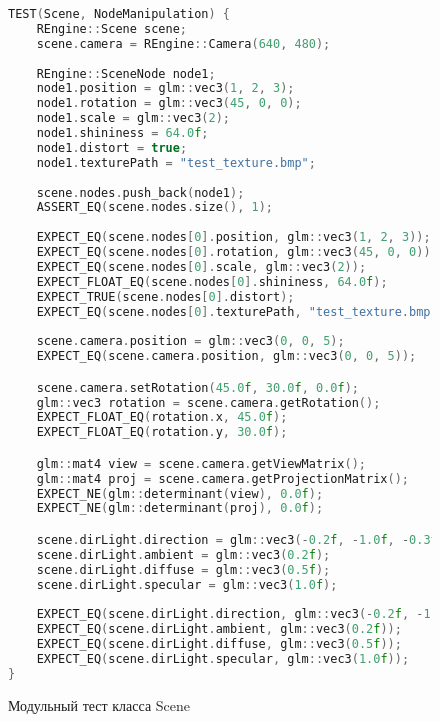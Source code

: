 \begin{figure}[ht]
\begin{lstlisting}[language=C++]
TEST(Scene, NodeManipulation) {
    REngine::Scene scene;
    scene.camera = REngine::Camera(640, 480);
    
    REngine::SceneNode node1;
    node1.position = glm::vec3(1, 2, 3);
    node1.rotation = glm::vec3(45, 0, 0);
    node1.scale = glm::vec3(2);
    node1.shininess = 64.0f;
    node1.distort = true;
    node1.texturePath = "test_texture.bmp";
    
    scene.nodes.push_back(node1);
    ASSERT_EQ(scene.nodes.size(), 1);
    
    EXPECT_EQ(scene.nodes[0].position, glm::vec3(1, 2, 3));
    EXPECT_EQ(scene.nodes[0].rotation, glm::vec3(45, 0, 0));
    EXPECT_EQ(scene.nodes[0].scale, glm::vec3(2));
    EXPECT_FLOAT_EQ(scene.nodes[0].shininess, 64.0f);
    EXPECT_TRUE(scene.nodes[0].distort);
    EXPECT_EQ(scene.nodes[0].texturePath, "test_texture.bmp");
    
    scene.camera.position = glm::vec3(0, 0, 5);
    EXPECT_EQ(scene.camera.position, glm::vec3(0, 0, 5));

    scene.camera.setRotation(45.0f, 30.0f, 0.0f);
    glm::vec3 rotation = scene.camera.getRotation();
    EXPECT_FLOAT_EQ(rotation.x, 45.0f);
    EXPECT_FLOAT_EQ(rotation.y, 30.0f);

    glm::mat4 view = scene.camera.getViewMatrix();
    glm::mat4 proj = scene.camera.getProjectionMatrix();
    EXPECT_NE(glm::determinant(view), 0.0f);
    EXPECT_NE(glm::determinant(proj), 0.0f);

    scene.dirLight.direction = glm::vec3(-0.2f, -1.0f, -0.3f);
    scene.dirLight.ambient = glm::vec3(0.2f);
    scene.dirLight.diffuse = glm::vec3(0.5f);
    scene.dirLight.specular = glm::vec3(1.0f);
    
    EXPECT_EQ(scene.dirLight.direction, glm::vec3(-0.2f, -1.0f, -0.3f));
    EXPECT_EQ(scene.dirLight.ambient, glm::vec3(0.2f));
    EXPECT_EQ(scene.dirLight.diffuse, glm::vec3(0.5f));
    EXPECT_EQ(scene.dirLight.specular, glm::vec3(1.0f));
}
\end{lstlisting}  
\caption{Модульный тест класса Scene}
\label{unitScene:image}
\end{figure}

